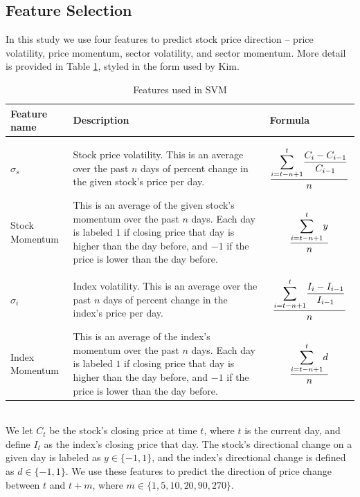 \documentclass[pageno]{jpaper}
\begin{document}
\subsection{Feature Selection}
In this study we use four features to predict stock price direction -- price volatility, price momentum, sector volatility, and sector momentum. More detail is provided in Table \ref{table: features}, styled in the form used by Kim\cite{kim}.

\begin{table}[H]
\caption{Features used in SVM} \label{table: features}
\small
\begin{tabular}{p{3cm} p{6cm} p{6cm}}
\hline
Feature name & Description & Formula \\
\hline \\
$ \sigma_s$ & Stock price volatility. This is an average over the past $n$ days of percent change in the given stock's price per day. & $$\dfrac{\mathlarger{\sum}_{i=t-n+1}^t \dfrac{C_i - C_{i-1}}{C_{i-1}}}{n}$$ \\
Stock Momentum & This is an average of the given stock's momentum over the past $n$ days. Each day is labeled $1$ if closing price that day is higher than the day before, and $-1$ if the price is lower than the day before. & $$\dfrac{\mathlarger{\sum}_{i=t-n+1}^t y}{n}$$ \\ \\
$\sigma_i$ & Index volatility. This is an average over the past $n$ days of percent change in the index's price per day. & $$\dfrac{\mathlarger{\sum}_{i=t-n+1}^t \dfrac{I_i - I_{i-1}}{I_{i-1}}}{n}$$ \\ 
Index Momentum & This is an average of the index's momentum over the past $n$ days. Each day is labeled $1$ if closing price that day is higher than the day before, and $-1$ if the price is lower than the day before. & $$\dfrac{\mathlarger{\sum}_{i=t-n+1}^t d}{n}$$ \\ \hline
\end{tabular}
\footnotesize
\\We let $C_t$ be the stock's closing price at time $t$, where $t$ is the current day, and define $I_t$ as the index's closing price that day. The stock's directional change on a given day is labeled as $y \in \{-1, 1\}$, and the index's directional change is defined as $d \in \{-1, 1\}$. We use these features to predict the direction of price change between $t$ and $t + m$, where $m \in \{1, 5, 10, 20, 90, 270\}$.
\end{table}
\medskip
\end{document}
